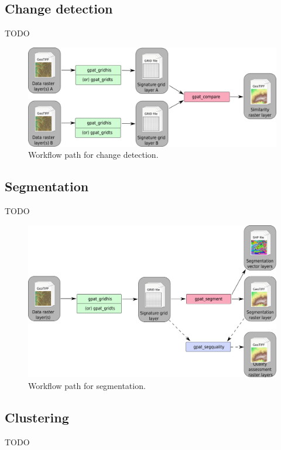 \documentclass[12pt,margin=0.5in]{article}
\begin{document}
\FloatBarrier

\subsection{Change detection}
TODO
\begin{figure}[h]
	\centering
	\includegraphics[width=\textwidth]{compare_scheme.png}
	\caption{Workflow path for change detection.}
	\label{FIG:CHANGE}
\end{figure}

\FloatBarrier

\subsection{Segmentation}
TODO
\begin{figure}[h]
	\centering
	\includegraphics[width=\textwidth]{segment_scheme.png}
	\caption{Workflow path for segmentation.}
	\label{FIG:SEGMENT}
\end{figure}

\FloatBarrier

\subsection{Clustering}
TODO
\end{document}

